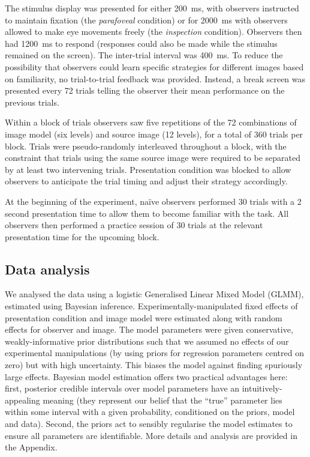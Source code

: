 \documentclass[doc, 11pt,a4paper,natbib]{apa6}\usepackage[]{graphicx}\usepackage[]{color}
\begin{document}
The stimulus display was presented for either 200~ms, with observers instructed to maintain fixation (the \textit{parafoveal} condition) or for 2000~ms with observers allowed to make eye movements freely (the \textit{inspection} condition).
Observers then had 1200~ms to respond (responses could also be made while the stimulus remained on the screen). 
The inter-trial interval was 400~ms.
To reduce the possibility that observers could learn specific strategies for different images based on familiarity, no trial-to-trial feedback was provided.
Instead, a break screen was presented every 72 trials telling the observer their mean performance on the previous trials.

Within a block of trials observers saw five repetitions of the 72 combinations of image model (six levels) and source image (12 levels), for a total of 360 trials per block.
Trials were pseudo-randomly interleaved throughout a block, with the constraint that trials using the same source image were required to be separated by at least two intervening trials. 
Presentation condition was blocked to allow observers to anticipate the trial timing and adjust their strategy accordingly.

At the beginning of the experiment, na\"{i}ve observers performed 30 trials with a 2 second presentation time to allow them to become familiar with the task.
All observers then performed a practice session of 30 trials at the relevant presentation time for the upcoming block.

\subsection{Data analysis}

We analysed the data using a logistic Generalised Linear Mixed Model (GLMM), estimated using Bayesian inference.
Experimentally-manipulated fixed effects of presentation condition and image model were estimated along with random effects for observer and image.
The model parameters were given conservative, weakly-informative prior distributions such that we assumed no effects of our experimental manipulations (by using priors for regression parameters centred on zero) but with high uncertainty.
This biases the model against finding spuriously large effects.
Bayesian model estimation offers two practical advantages here: first, posterior credible intervals over model parameters have an intuitively-appealing meaning (they represent our belief that the ``true'' parameter lies within some interval with a given probability, conditioned on the priors, model and data). 
Second, the priors act to sensibly regularise the model estimates to ensure all parameters are identifiable.
More details and analysis are provided in the Appendix.
\end{document}
